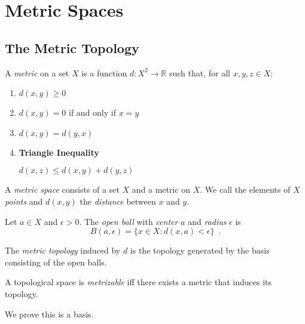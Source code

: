 \chapter{Metric Spaces}

\section{The Metric Topology}

\begin{df}[Metric]
  A \emph{metric} on a set $X$ is a function $d : X^2 \rightarrow \mathbb{R}$ such that, for all $x,y,z \in X$:
  \begin{enumerate}
    \item
    $d(x,y) \geq 0$
    \item
    $d(x,y) = 0$ if and only if $x = y$
    \item
    $d(x,y) = d(y,x)$
    \item
    \textbf{Triangle Inequality}

    $d(x,z) \leq d(x,y) + d(y,z)$
  \end{enumerate}

  A \emph{metric space} consists of a set $X$ and a metric on $X$. We call the elements of $X$ \emph{points} and $d(x,y)$ the \emph{distance} between $x$ and $y$.
\end{df}

\begin{df}
  Let $a \in X$ and $\epsilon > 0$. The \emph{open ball} with \emph{center} $a$ and \emph{radius} $\epsilon$ is
  \[ B(a, \epsilon) = \{ x \in X : d(x,a) < \epsilon \} \enspace . \]
\end{df}

\begin{df}
  The \emph{metric topology} induced by $d$ is the topology generated by the basis consisting of the open balls.

  A topological space is \emph{metrizable} iff there exists a metric that induces its topology.

  We prove this is a basis.
\end{df}

